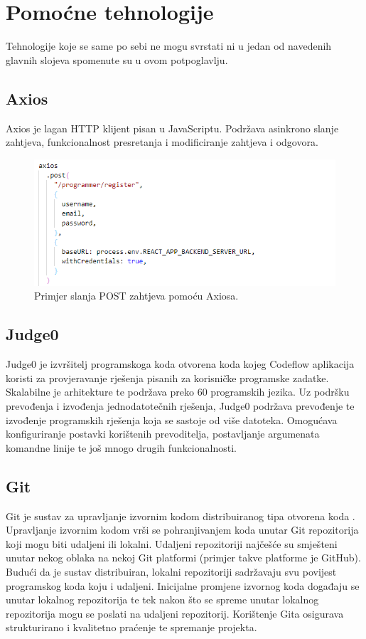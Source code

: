 \documentclass[times, utf8, zavrsni, numeric]{fer}
\begin{document}
			\section{Pomoćne tehnologije}
			Tehnologije koje se same po sebi ne mogu svrstati ni u jedan od navedenih glavnih slojeva spomenute su u ovom potpoglavlju.
			\subsection{Axios}
			Axios\cite{axios2021} je lagan HTTP  klijent pisan u JavaScriptu. Podržava asinkrono slanje zahtjeva, funkcionalnost presretanja i modificiranje zahtjeva i odgovora. 
			\begin{figure}[H]
				\centering
				\includegraphics[scale=0.65]{pictures/prikazi/Axios.png}
				\caption{Primjer slanja POST zahtjeva pomoću Axiosa.}
				\label{fig:axios}
			\end{figure}
			\subsection{Judge0}
			Judge0\cite{judge02021} je izvršitelj programskoga koda otvorena koda kojeg Codeflow aplikacija koristi za provjeravanje rješenja pisanih za korisničke programske zadatke. Skalabilne je arhitekture te podržava preko 60 programskih jezika. Uz podršku prevođenja i izvođenja jednodatotečnih rješenja, Judge0 podržava prevođenje te izvođenje programskih rješenja koja se sastoje od više datoteka. Omogućava konfiguriranje postavki korištenih prevoditelja, postavljanje argumenata komandne linije te još mnogo drugih funkcionalnosti.
			\subsection{Git}
			Git\cite{git2021} je sustav za upravljanje izvornim kodom distribuiranog tipa otvorena koda . Upravljanje izvornim kodom vrši se pohranjivanjem koda unutar Git repozitorija koji mogu biti udaljeni ili lokalni. Udaljeni repozitoriji  najčešće su smješteni unutar nekog oblaka  na nekoj Git platformi (primjer takve platforme je GitHub). Budući da je sustav distribuiran, lokalni repozitoriji sadržavaju svu povijest programskog koda koju i udaljeni. Inicijalne promjene izvornog koda događaju se unutar lokalnog repozitorija te tek nakon što se spreme unutar lokalnog repozitorija mogu se poslati na udaljeni repozitorij. Korištenje Gita osigurava strukturirano i kvalitetno praćenje te spremanje projekta.
	
\end{document}
